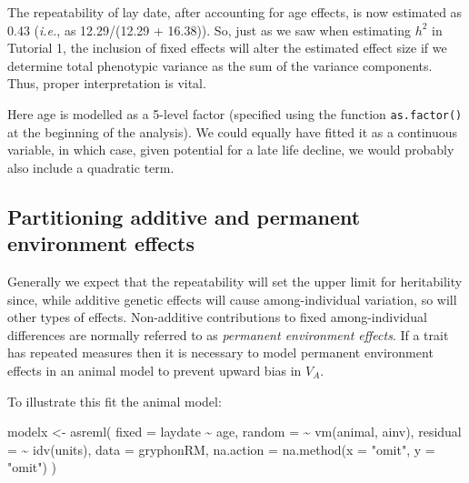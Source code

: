 \documentclass[
  12pt,
]{book}
\newenvironment{Shaded}{\begin{snugshade}}{\end{snugshade}}
\newcommand{\AttributeTok}[1]{\textcolor[rgb]{0.77,0.63,0.00}{#1}}
\newcommand{\FunctionTok}[1]{\textcolor[rgb]{0.00,0.00,0.00}{#1}}
\newcommand{\NormalTok}[1]{#1}
\newcommand{\OtherTok}[1]{\textcolor[rgb]{0.56,0.35,0.01}{#1}}
\newcommand{\SpecialCharTok}[1]{\textcolor[rgb]{0.00,0.00,0.00}{#1}}
\newcommand{\StringTok}[1]{\textcolor[rgb]{0.31,0.60,0.02}{#1}}
\begin{document}
The repeatability of lay date, after accounting for age effects, is now estimated as 0.43 (\emph{i.e.}, as 12.29/(12.29 + 16.38)). So, just as we saw when estimating \(h^2\) in Tutorial 1, the inclusion of fixed effects will alter the estimated effect size if we determine total phenotypic variance as the sum of the variance components. Thus, proper interpretation is vital.

Here age is modelled as a 5-level factor (specified using the function \texttt{as.factor()} at the beginning of the analysis). We could equally have fitted it as a continuous variable, in which case, given potential for a late life decline, we would probably also include a quadratic term.

\hypertarget{partitioning-additive-and-permanent-environment-effects}{%
\subsection{Partitioning additive and permanent environment effects}\label{partitioning-additive-and-permanent-environment-effects}}

Generally we expect that the repeatability will set the upper limit for heritability since, while additive genetic effects will cause among-individual variation, so will other types of effects. Non-additive contributions to fixed among-individual differences are normally referred to as \emph{permanent environment effects}. If a trait has repeated measures then it is necessary to model permanent environment effects in an animal model to prevent upward bias in \(V_A\).

To illustrate this fit the animal model:

\begin{Shaded}
\begin{Highlighting}[]
\NormalTok{modelx }\OtherTok{\textless{}{-}} \FunctionTok{asreml}\NormalTok{(}
  \AttributeTok{fixed =}\NormalTok{ laydate }\SpecialCharTok{\textasciitilde{}}\NormalTok{ age,}
  \AttributeTok{random =} \SpecialCharTok{\textasciitilde{}} \FunctionTok{vm}\NormalTok{(animal, ainv),}
  \AttributeTok{residual =} \SpecialCharTok{\textasciitilde{}} \FunctionTok{idv}\NormalTok{(units),}
  \AttributeTok{data =}\NormalTok{ gryphonRM,}
  \AttributeTok{na.action =} \FunctionTok{na.method}\NormalTok{(}\AttributeTok{x =} \StringTok{"omit"}\NormalTok{, }\AttributeTok{y =} \StringTok{"omit"}\NormalTok{)}
\NormalTok{)}
\end{Highlighting}
\end{Shaded}
\end{document}
